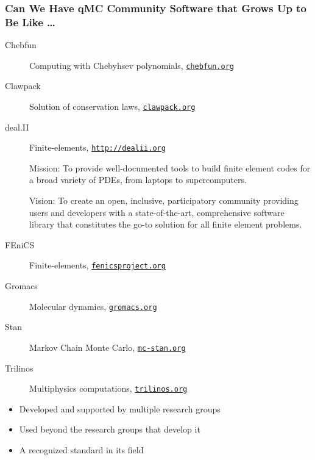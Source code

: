 \documentclass[11pt,compress,xcolor={usenames,dvipsnames},aspectratio=169]{beamer}
\begin{document}
\begin{frame}
\frametitle{Can We Have qMC Community Software that Grows Up to Be Like \ldots }

\vspace{-4ex}

\begin{description}
\item[Chebfun] Computing with Chebyhsev polynomials, \href{http://www.chebfun.org}{\nolinkurl{chebfun.org}}

\item[Clawpack] Solution of conservation laws, \href{http://www.clawpack.org}{\nolinkurl{clawpack.org}}

\item[deal.II] Finite-elements, \href{http://www.dealii.org}{\nolinkurl{http://dealii.org}} \\

{\small Mission: To provide well-documented tools to build finite element codes for a broad variety of PDEs, from laptops to supercomputers.

\alert{Vision: To create an open, inclusive, participatory community providing users and developers with a state-of-the-art, comprehensive software library that constitutes the go-to solution for all finite element problems.}}

\item[FEniCS] Finite-elements, \href{https://fenicsproject.org}{\nolinkurl{fenicsproject.org}}

\item[Gromacs] Molecular dynamics, \href{http://www.gromacs.org}{\nolinkurl{gromacs.org}}

\item[Stan] Markov Chain Monte Carlo, \href{http://mc-stan.org}{\nolinkurl{mc-stan.org}}

\item[Trilinos] Multiphysics computations, \href{https://trilinos.org}{\nolinkurl{trilinos.org}}

\end{description}

\vspace{-4ex}

\begin{itemize}
\item Developed and supported by multiple research groups

\item Used beyond the research groups that develop it

\item A recognized standard in its field 
\end{itemize}
\end{frame}
\end{document}
